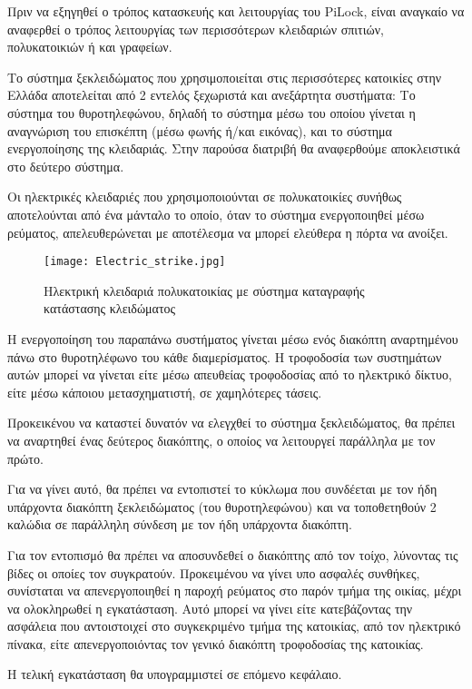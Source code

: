 \label{ch:unlock_mechanism}
Πριν να εξηγηθεί ο τρόπος κατασκευής και λειτουργίας του PiLock, είναι αναγκαίο να αναφερθεί ο τρόπος λειτουργίας των περισσότερων κλειδαριών σπιτιών, πολυκατοικιών ή και γραφείων.

Το σύστημα ξεκλειδώματος που χρησιμοποιείται στις περισσότερες κατοικίες στην Ελλάδα αποτελείται από 2 εντελός ξεχωριστά και ανεξάρτητα συστήματα: Το σύστημα του θυροτηλεφώνου, δηλαδή το σύστημα μέσω του οποίου γίνεται η αναγνώριση του επισκέπτη (μέσω φωνής ή/και εικόνας), και το σύστημα ενεργοποίησης της κλειδαριάς. Στην παρούσα διατριβή θα αναφερθούμε αποκλειστικά στο δεύτερο σύστημα.

Οι ηλεκτρικές κλειδαριές που χρησιμοποιούνται σε πολυκατοικίες συνήθως αποτελούνται από ένα μάνταλο το οποίο, όταν το σύστημα ενεργοποιηθεί μέσω ρεύματος, απελευθερώνεται με αποτέλεσμα να μπορεί ελεύθερα η πόρτα να ανοίξει.

\begin{figure}[h]
	\centering
		\texttt{[image: Electric\_strike.jpg]}
	\caption{Ηλεκτρική κλειδαριά πολυκατοικίας με σύστημα καταγραφής κατάστασης κλειδώματος}
\end{figure}

Η ενεργοποίηση του παραπάνω συστήματος γίνεται μέσω ενός διακόπτη αναρτημένου πάνω στο θυροτηλέφωνο του κάθε διαμερίσματος. Η τροφοδοσία των συστημάτων αυτών μπορεί να γίνεται είτε μέσω απευθείας τροφοδοσίας από το ηλεκτρικό δίκτυο, είτε μέσω κάποιου μετασχηματιστή, σε χαμηλότερες τάσεις.

Προκεικένου να καταστεί δυνατόν να ελεγχθεί το σύστημα ξεκλειδώματος, θα πρέπει να αναρτηθεί ένας δεύτερος διακόπτης, ο οποίος να λειτουργεί παράλληλα με τον πρώτο.  %

Για να γίνει αυτό, θα πρέπει να εντοπιστεί το κύκλωμα που συνδέεται με τον ήδη υπάρχοντα διακόπτη ξεκλειδώματος (του θυροτηλεφώνου) και να τοποθετηθούν 2 καλώδια σε παράλληλη σύνδεση με τον ήδη υπάρχοντα διακόπτη.

Για τον εντοπισμό θα πρέπει να αποσυνδεθεί ο διακόπτης από τον τοίχο, λύνοντας τις βίδες οι οποίες τον συγκρατούν. Προκειμένου να γίνει υπο ασφαλές συνθήκες, συνίσταται να απενεργοποιηθεί η παροχή ρεύματος στο παρόν τμήμα της οικίας, μέχρι να ολοκληρωθεί η εγκατάσταση. Αυτό μπορεί να γίνει είτε κατεβάζοντας την ασφάλεια που αντοιστοιχεί στο συγκεκριμένο τμήμα της κατοικίας, από τον ηλεκτρικό πίνακα, είτε απενεργοποιόντας τον γενικό διακόπτη τροφοδοσίας της κατοικίας.

Η τελική εγκατάσταση θα υπογραμμιστεί σε επόμενο κεφάλαιο.